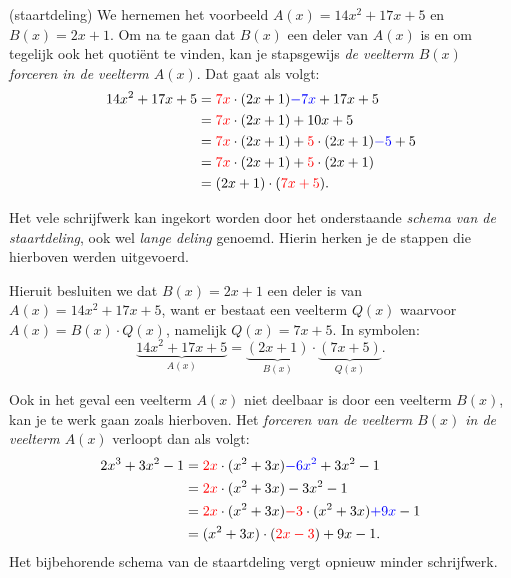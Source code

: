 \documentclass{ximera}
\begin{document}
\begin{algorithm}(staartdeling)
	We hernemen het voorbeeld \(A(x) = 14x^2+17x+5\) en \(B(x) = 2x+1\). Om na te gaan dat \(B(x)\) een deler van \(A(x)\) is en om tegelijk ook het quotiënt te vinden, kan je stapsgewijs \textit{ de veelterm \(B(x)\) forceren in de veelterm \(A(x)\)}. Dat gaat als volgt:
	\begin{align*}
	14x^2 + 17x + 5 
	& = {\color{red}7x} \cdot (2x+1) {\color{blue}- 7x} + 17x + 5 \\
	& = {\color{red}7x} \cdot (2x+1) + 10x + 5 \\
	& = {\color{red}7x} \cdot (2x+1) + {\color{red}5} \cdot (2x+1) {\color{blue}- 5} + 5 \\
	& = {\color{red}7x} \cdot (2x+1) + {\color{red}5} \cdot (2x+1) \\
	& = (2x+1)\cdot({\color{red}7x + 5}).
	\end{align*}
	
	
	
	Het vele schrijfwerk kan ingekort worden door het onderstaande \textit{ schema van de staartdeling}, ook wel \textit{ lange deling} genoemd. Hierin herken je de stappen die hierboven werden uitgevoerd. 


	Hieruit besluiten we dat \(B(x) = 2x+1\) een deler is van \(A(x) = 14x^2+17x+5\), want er bestaat een veelterm \(Q(x)\) waarvoor \(A(x) = B(x) \cdot Q(x)\), namelijk \(Q(x) = 7x+5\). In symbolen:
	\[
	\underbrace{14x^2+17x+5}_{A(x)} = \underbrace{(2x+1)}_{B(x)}\cdot\underbrace{(7x + 5)}_{Q(x)}.
	\]

	Ook in het geval een veelterm \(A(x)\) niet deelbaar is door een veelterm \(B(x)\), kan je te werk gaan zoals hierboven. Het \textit{ forceren van de veelterm \(B(x)\) in de veelterm \(A(x)\)} verloopt dan als volgt:
	\begin{align*}
	2x^3 + 3x^2 - 1 
	& = {\color{red}2x} \cdot (x^2+3x) {\color{blue}- 6x^2} + 3x^2 - 1 \\
	& = {\color{red}2x} \cdot (x^2+3x) - 3x^2 - 1 \\
	& = {\color{red}2x} \cdot (x^2+3x) {\color{red}- 3} \cdot (x^2+3x) {\color{blue}+ 9x} - 1  \\
	& = (x^2+3x) \cdot ({\color{red}2x - 3}) + 9x - 1.
	\end{align*}
	Het bijbehorende schema van de staartdeling vergt opnieuw minder schrijfwerk. 


\end{algorithm}
\end{document}
